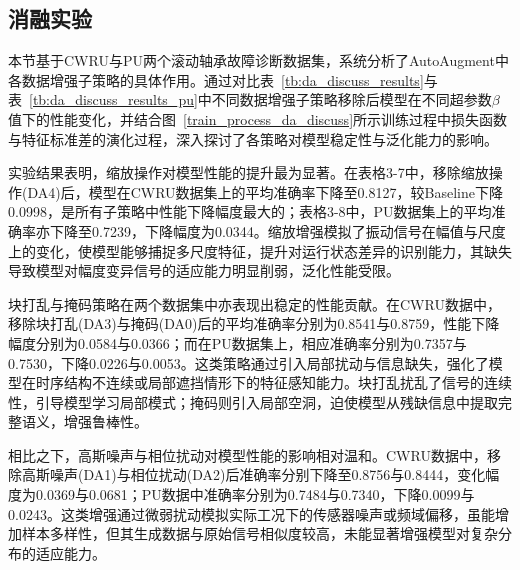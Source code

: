 \documentclass[master]{thesis-uestc}
\begin{document}
\subsection{消融实验}
本节基于CWRU与PU两个滚动轴承故障诊断数据集，系统分析了AutoAugment中各数据增强子策略的具体作用。通过对比表~\ref{tb:da_discuss_results}与表~\ref{tb:da_discuss_results_pu}中不同数据增强子策略移除后模型在不同超参数$\beta$值下的性能变化，并结合图~\ref{train_process_da_discuss}所示训练过程中损失函数与特征标准差的演化过程，深入探讨了各策略对模型稳定性与泛化能力的影响。

实验结果表明，缩放操作对模型性能的提升最为显著。在表格3-7中，移除缩放操作(DA4)后，模型在CWRU数据集上的平均准确率下降至0.8127，较Baseline下降0.0998，是所有子策略中性能下降幅度最大的；表格3-8中，PU数据集上的平均准确率亦下降至0.7239，下降幅度为0.0344。缩放增强模拟了振动信号在幅值与尺度上的变化，使模型能够捕捉多尺度特征，提升对运行状态差异的识别能力，其缺失导致模型对幅度变异信号的适应能力明显削弱，泛化性能受限。

块打乱与掩码策略在两个数据集中亦表现出稳定的性能贡献。在CWRU数据中，移除块打乱(DA3)与掩码(DA0)后的平均准确率分别为0.8541与0.8759，性能下降幅度分别为0.0584与0.0366；而在PU数据集上，相应准确率分别为0.7357与0.7530，下降0.0226与0.0053。这类策略通过引入局部扰动与信息缺失，强化了模型在时序结构不连续或局部遮挡情形下的特征感知能力。块打乱扰乱了信号的连续性，引导模型学习局部模式；掩码则引入局部空洞，迫使模型从残缺信息中提取完整语义，增强鲁棒性。

相比之下，高斯噪声与相位扰动对模型性能的影响相对温和。CWRU数据中，移除高斯噪声(DA1)与相位扰动(DA2)后准确率分别下降至0.8756与0.8444，变化幅度为0.0369与0.0681；PU数据中准确率分别为0.7484与0.7340，下降0.0099与0.0243。这类增强通过微弱扰动模拟实际工况下的传感器噪声或频域偏移，虽能增加样本多样性，但其生成数据与原始信号相似度较高，未能显著增强模型对复杂分布的适应能力。
\end{document}
